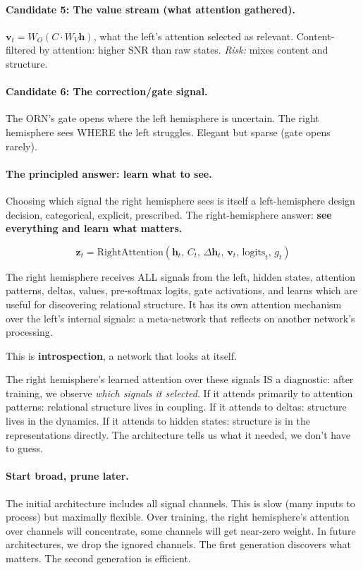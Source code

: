 \documentclass[11pt, a4paper]{article}
\newcommand{\h}{\mathbf{h}}
\theoremstyle{plain}
\theoremstyle{definition}
\theoremstyle{remark}
\begin{document}
\paragraph{Candidate 5: The value stream (what attention gathered).}
$\mathbf{v}_t = W_O(C \cdot W_V \h)$, what the left's attention selected as relevant.
Content-filtered by attention: higher SNR than raw states.
\emph{Risk:} mixes content and structure.

\paragraph{Candidate 6: The correction/gate signal.}
The ORN's gate opens where the left hemisphere is uncertain.
The right hemisphere sees WHERE the left struggles.
Elegant but sparse (gate opens rarely).

\paragraph{The principled answer: learn what to see.}
Choosing which signal the right hemisphere sees is itself a left-hemisphere design decision, categorical, explicit, prescribed.
The right-hemisphere answer: \textbf{see everything and learn what matters.}

\begin{equation}
\mathbf{z}_t = \mathrm{RightAttention}\!\left(\h_t, \, C_t, \, \Delta\h_t, \, \mathbf{v}_t, \, \mathrm{logits}_t, \, g_t\right)
\end{equation}

The right hemisphere receives ALL signals from the left, hidden states, attention patterns, deltas, values, pre-softmax logits, gate activations, and learns which are useful for discovering relational structure.
It has its own attention mechanism over the left's internal signals: a meta-network that reflects on another network's processing.

This is \textbf{introspection}, a network that looks at itself.

The right hemisphere's learned attention over these signals IS a diagnostic:
after training, we observe \emph{which signals it selected}.
If it attends primarily to attention patterns: relational structure lives in coupling.
If it attends to deltas: structure lives in the dynamics.
If it attends to hidden states: structure is in the representations directly.
The architecture tells us what it needed, we don't have to guess.

\paragraph{Start broad, prune later.}
The initial architecture includes all signal channels.
This is slow (many inputs to process) but maximally flexible.
Over training, the right hemisphere's attention over channels will concentrate, some channels will get near-zero weight.
In future architectures, we drop the ignored channels.
The first generation discovers what matters.
The second generation is efficient.
\end{document}

